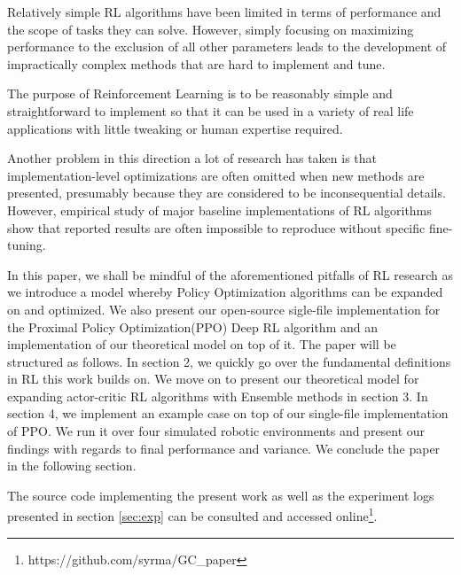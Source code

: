 Relatively simple RL algorithms have been limited in terms of performance and the scope of tasks they can solve. However, simply focusing on maximizing performance to the exclusion of all other parameters leads to the development of impractically complex methods that are hard to implement and tune.%

The purpose of Reinforcement Learning is to be reasonably simple and straightforward to implement so that it can be used in a variety of real life applications with little tweaking or human expertise required.

Another problem in this direction a lot of research has taken is that implementation-level optimizations are often omitted when new methods are presented, presumably because they are considered to be inconsequential details. However, empirical study of  major baseline implementations of RL algorithms show that reported results are often impossible to reproduce without specific fine-tuning\cite{henderson2018deep}\cite{islam2017reproducibility}\cite{andrychowicz2021matters}\cite{dossa2021empirical}.


In this paper, we shall be mindful of the aforementioned pitfalls of RL research as we introduce a model whereby Policy Optimization algorithms can be expanded on and optimized. We also present our open-source sigle-file implementation for the Proximal Policy Optimization\cite{schulman2017proximal}(PPO) Deep RL algorithm and an implementation of our theoretical model on top of it. The paper will be structured as follows. In section 2, we quickly go over the fundamental definitions in RL this work builds on. We move on to present our theoretical model for expanding actor-critic RL algorithms with Ensemble methods in section 3. In section 4, we implement an example case on top of our single-file implementation of PPO. We run it over four simulated robotic environments and present our findings with regards to final performance and variance. We conclude the paper in the following section.

The source code implementing the present work as well as the experiment logs presented in section \ref{sec:exp} can be consulted and accessed online\footnote{https://github.com/syrma/GC\_paper}.
